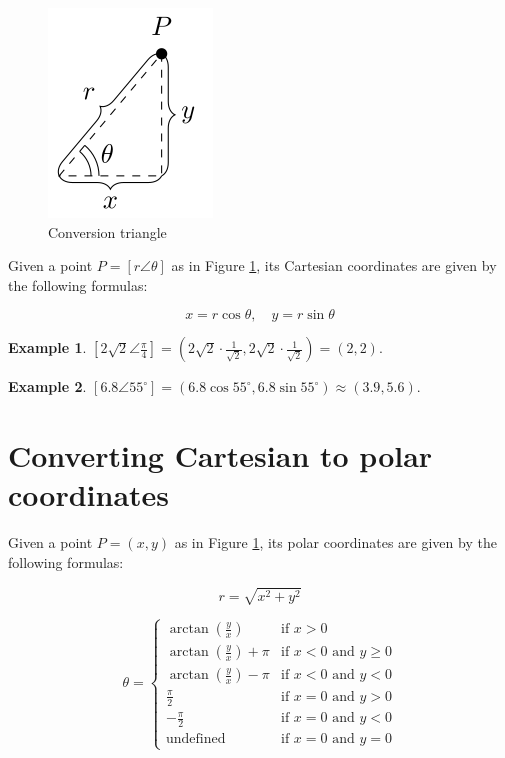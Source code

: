 \documentclass[
  12pt,
  oneside]{book}
\theoremstyle{definition}
\theoremstyle{definition}
\newtheorem{example}{Example}[chapter]
\theoremstyle{definition}
\theoremstyle{definition}
\theoremstyle{remark}
\begin{document}
\begin{figure}

{\centering \includegraphics{t18-polar-pics-2} 

}

\caption{Conversion triangle}\label{fig:t18-triangle}
\end{figure}

Given a point \(P=[r\angle\theta]\) as in Figure \ref{fig:t18-triangle}, its Cartesian coordinates are given by the following formulas:

\[\boxed{x=r\cos\theta, \quad y=r\sin\theta}\]

\begin{example}
\([2\sqrt2\angle \frac\pi4] = (2\sqrt{2}\cdot\frac{1}{\sqrt2},2\sqrt{2}\cdot\frac{1}{\sqrt2})=(2,2)\).
\end{example}

\begin{example}
\([6.8\angle 55^\circ] = (6.8\cos 55^\circ,6.8\sin 55^\circ) \approx(3.9,5.6)\).
\end{example}

\hypertarget{converting-cartesian-to-polar-coordinates}{%
\section{Converting Cartesian to polar coordinates}\label{converting-cartesian-to-polar-coordinates}}

Given a point \(P=(x,y)\) as in Figure \ref{fig:t18-triangle}, its polar coordinates are given by the following formulas:

\[\boxed{r=\sqrt{x^2+y^2}}\]

\[\boxed{\theta=\begin{cases}
        \arctan(\frac{y}{x}) & \text{if }x>0\\
        \arctan(\frac{y}{x})+\pi &\text{if }x<0\text{ and }y\geq0\\
        \arctan(\frac{y}{x})-\pi &\text{if }x<0\text{ and }y<0\\
        \frac{\pi}2&\text{if }x=0\text{ and }y>0\\
        -\frac{\pi}2&\text{if }x=0\text{ and }y<0\\
        \text{undefined} &\text{if }x=0\text{ and }y=0
\end{cases}}\]
\end{document}
